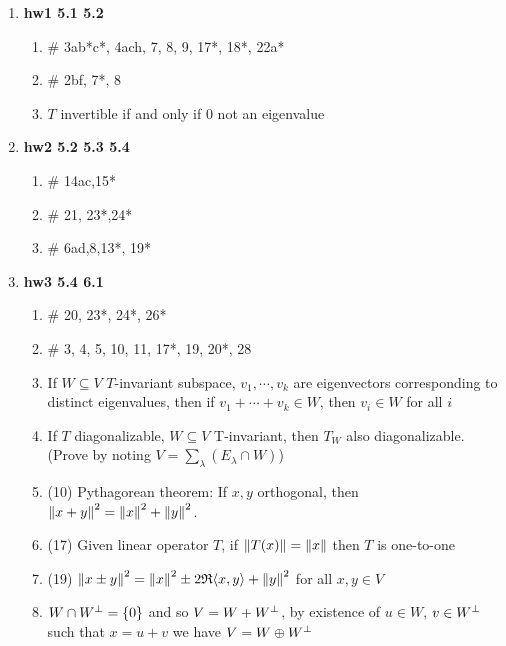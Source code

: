 \documentclass[11pt]{article}
\begin{document}
\begin{enumerate}
    \item \textbf{hw1 5.1 5.2} 
    \begin{enumerate}
        \item {} \# 3ab*c*, 4ach, 7, 8, 9, 17*, 18*, 22a*
        \item {} \# 2bf, 7*, 8 
        \item $T$ invertible if and only if 0 not an eigenvalue 
    \end{enumerate}
    \item \textbf{hw2 5.2 5.3 5.4}
    \begin{enumerate}
        \item {} \# 14ac,15*
        \item {} \# 21, 23*,24*
        \item {} \# 6ad,8,13*, 19* 
    \end{enumerate}
    \item \textbf{hw3 5.4 6.1} 
    \begin{enumerate}
        \item {} \# 20, 23*, 24*, 26*
        \item {} \# 3, 4, 5, 10, 11, 17*, 19, 20*, 28
        \item {}  If $W\subseteq V$ $T$-invariant subspace, $v_1,\cdots, v_k$ are eigenvectors corresponding to distinct eigenvalues, then if $v_1 + \cdots + v_k \in W$, then $v_i \in W$ for all $i$
        \item {}  If $T$ diagonalizable, $W \subseteq V$ T-invariant, then $T_W$ also diagonalizable. (Prove by noting $V = \textstyle\sum_{\lambda} (E_{\lambda}\cap W)$)
        \item (10) Pythagorean theorem: If $x,y$ orthogonal, then $\left\lVert x+y\right\rVert^2 = \left\lVert x\right\rVert^2 + \left\lVert y\right\rVert^2$.
        \item (17) Given linear operator $T$, if $\left\lVert T(x)\right\rVert = \left\lVert x\right\rVert$ then $T$ is one-to-one 
        \item (19) $\left\lVert x\pm y\right\rVert^2 = \left\lVert x\right\rVert^2 \pm 2 \mathfrak{R} \langle x,y\rangle + \left\lVert y\right\rVert^2$ for all $x,y\in V$  
        \item $W \cap W^{\perp} = \{0\}$ and so $V = W + W^{\perp}$, by existence of $u\in W$, $v\in W^{\perp}$ such that $x=u+v$ we have $V = W \oplus W^{\perp}$
    \end{enumerate}

\end{enumerate}
\end{document}

